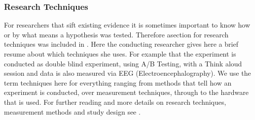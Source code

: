 \subsubsection{Research Techniques}

For researchers that sift existing evidence it is sometimes important to know how or by what means a hypothesis was tested. Therefore asection for research techniques was included in \briefingform. Here the conducting researcher gives here a brief resume about which techniques she uses. For example that the experiment is conducted as double blind experiment, using A/B Testing, with a Think aloud session and data is also measured via EEG (Electroencephalography). We use the term techniques here for everything ranging from methods that tell how an experiment is conducted, over measurement techniques, through to the hardware that is used. For further reading and more details on research techniques, measurement methods and study design see \cite{Albert2008,Wohlin2012}.